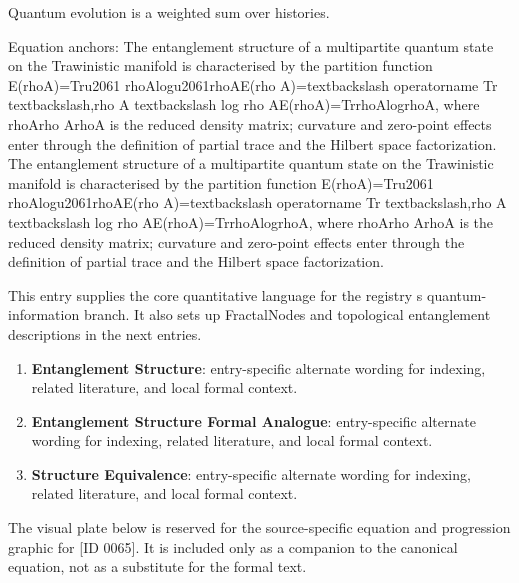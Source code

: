 Quantum evolution is a weighted sum over histories.

Equation anchors: The entanglement structure of a multipartite quantum state on the Trawinistic manifold is characterised by the partition function E(rhoA)=Tru2061 rhoAlogu2061rhoAE(rho A)=textbackslash operatorname Tr textbackslash,rho A textbackslash log rho AE(rhoA)=TrrhoAlogrhoA, where rhoArho ArhoA is the reduced density matrix; curvature and zero-point effects enter through the definition of partial trace and the Hilbert space factorization. The entanglement structure of a multipartite quantum state on the Trawinistic manifold is characterised by the partition function E(rhoA)=Tru2061 rhoAlogu2061rhoAE(rho A)=textbackslash operatorname Tr textbackslash,rho A textbackslash log rho AE(rhoA)=TrrhoAlogrhoA, where rhoArho ArhoA is the reduced density matrix; curvature and zero-point effects enter through the definition of partial trace and the Hilbert space factorization.

This entry supplies the core quantitative language for the registry s quantum-information branch. It also sets up FractalNodes and topological entanglement descriptions in the next entries.
\endgroup

\begingroup\footnotesize\sloppy
\begin{enumerate}[leftmargin=1.35em,itemsep=1pt,topsep=1pt,parsep=0pt]
\item \textbf{Entanglement Structure}: entry-specific alternate wording for indexing, related literature, and local formal context.
\item \textbf{Entanglement Structure Formal Analogue}: entry-specific alternate wording for indexing, related literature, and local formal context.
\item \textbf{Structure Equivalence}: entry-specific alternate wording for indexing, related literature, and local formal context.
\end{enumerate}
\endgroup

\begingroup\footnotesize\sloppy
The visual plate below is reserved for the source-specific equation and progression graphic for [ID 0065]. It is included only as a companion to the canonical equation, not as a substitute for the formal text.
\par\endgroup
\ifTZPDarkEdition
{}
\fi

